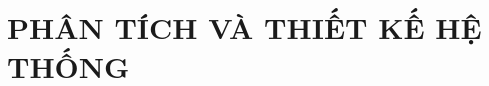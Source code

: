 \documentclass[../BTL.tex]{subfiles}
\begin{document}
\chapter{PHÂN TÍCH VÀ THIẾT KẾ HỆ THỐNG}


\clearpage


\clearpage


\end{document}
